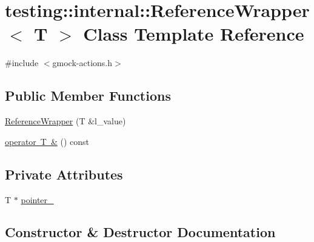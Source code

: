 \hypertarget{classtesting_1_1internal_1_1_reference_wrapper}{}\section{testing\+::internal\+::Reference\+Wrapper$<$ T $>$ Class Template Reference}
\label{classtesting_1_1internal_1_1_reference_wrapper}


{\ttfamily \#include $<$gmock-\/actions.\+h$>$}

\subsection*{Public Member Functions}
\begin{DoxyCompactItemize}
\item 
\mbox{\hyperlink{classtesting_1_1internal_1_1_reference_wrapper_ad33597ffc478c3af9190d1a288a76d39}{Reference\+Wrapper}} (T \&l\+\_\+value)
\item 
\mbox{\hyperlink{classtesting_1_1internal_1_1_reference_wrapper_a90ff0f93425244ca7f9cbd1d46017e80}{operator T \&}} () const
\end{DoxyCompactItemize}
\subsection*{Private Attributes}
\begin{DoxyCompactItemize}
\item 
T $\ast$ \mbox{\hyperlink{classtesting_1_1internal_1_1_reference_wrapper_abc085b4a0cdea43258c297c6989fdc7d}{pointer\+\_\+}}
\end{DoxyCompactItemize}


\subsection{Constructor \& Destructor Documentation}
\mbox{\label{classtesting_1_1internal_1_1_reference_wrapper_ad33597ffc478c3af9190d1a288a76d39}} 
